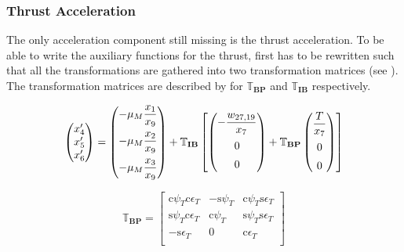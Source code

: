 \subsubsection{Thrust Acceleration}
\label{subsubsec:tsiThrust}
The only acceleration component still missing is the thrust acceleration. To be able to write the auxiliary functions for the thrust,  first has to be rewritten such that all the transformations are gathered into two transformation matrices (see ). The transformation matrices are described by  for $\mathbb{T}_{\mathbf{BP}}$ and $\mathbb{T}_{\mathbf{IB}}$ respectively.

\begin{equation} \label{eq:accAux}
\begin{pmatrix}
x'_{4}\\
x'_{5}\\
x'_{6}\\
\end{pmatrix}
=
\begin{pmatrix}
-\mu_{M}\dfrac{x_{1}}{x_{9}} \vspace{5pt} \\ \vspace{5pt}
-\mu_{M}\dfrac{x_{2}}{x_{9}}\\
-\mu_{M}\dfrac{x_{3}}{x_{9}}\\
\end{pmatrix}+
\mathbb{T}_{\mathbf{IB}}\left[
\begin{pmatrix}
-\dfrac{w_{27,19}}{x_{7}} \vspace{5pt} \\ \vspace{5pt}
0\\
0\\
\end{pmatrix}
+ 
\mathbb{T}_{\mathbf{BP}}
\begin{pmatrix}
\dfrac{T}{x_{7}} \vspace{5pt} \\ \vspace{5pt}
0\\
0\\
\end{pmatrix}
\right]
\end{equation}


\begin{equation} \label{eq:BPtrans}
\mathbb{T}_{\mathbf{BP}}=
\begin{bmatrix}
\text{c}\psi_{T}\text{c}\epsilon_{T} & -\text{s}\psi_{T} & \text{c}\psi_{T}\text{s}\epsilon_{T}\\
\text{s}\psi_{T}\text{c}\epsilon_{T} & \text{c}\psi_{T} & \text{s}\psi_{T}\text{s}\epsilon_{T}\\
-\text{s}\epsilon_{T} & 0 & \text{c}\epsilon_{T}\\
\end{bmatrix}
\end{equation}

